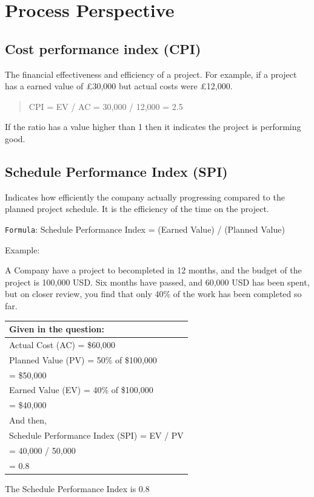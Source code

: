 \documentclass[]{book}
\begin{document}
\section{Process Perspective}\label{process-perspective}

\subsection{Cost performance index
(CPI)}\label{cost-performance-index-cpi}

The financial effectiveness and efficiency of a project. For example, if
a project has a earned value of £30,000 but actual costs were £12,000.

\begin{quote}
CPI = EV / AC = 30,000 / 12,000 = 2.5
\end{quote}

If the ratio has a value higher than 1 then it indicates the project is
performing good.

\subsection{Schedule Performance Index
(SPI)}\label{schedule-performance-index-spi}

Indicates how efficiently the company actually progressing compared to
the planned project schedule. It is the efficiency of the time on the
project.

\texttt{Formula}: Schedule Performance Index = (Earned Value) / (Planned
Value)

Example:

A Company have a project to becompleted in 12 months, and the budget of
the project is 100,000 USD. Six months have passed, and 60,000 USD has
been spent, but on closer review, you find that only 40\% of the work
has been completed so far.

\begin{longtable}[]{@{}l@{}}
\toprule
Given in the question:\tabularnewline
\midrule
\endhead
Actual Cost (AC) = \$60,000\tabularnewline
Planned Value (PV) = 50\% of \$100,000\tabularnewline
= \$50,000\tabularnewline
Earned Value (EV) = 40\% of \$100,000\tabularnewline
= \$40,000\tabularnewline
And then,\tabularnewline
Schedule Performance Index (SPI) = EV / PV\tabularnewline
= 40,000 / 50,000\tabularnewline
= 0.8\tabularnewline
\bottomrule
\end{longtable}

The Schedule Performance Index is 0.8
\end{document}
